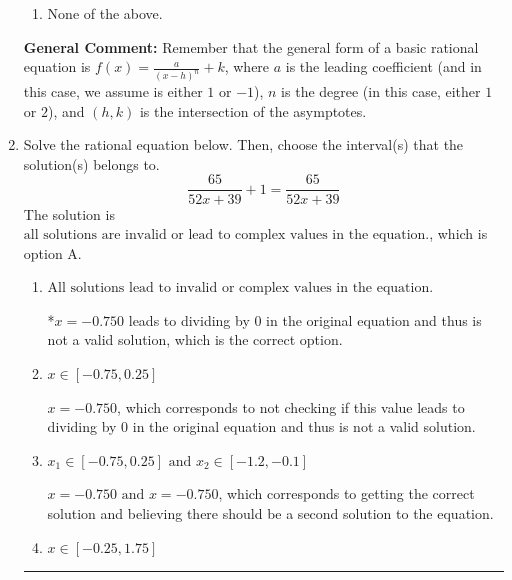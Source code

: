 \documentclass{extbook}[14pt]
\newcommand{\litem}[1]{\item #1

\rule{\textwidth}{0.4pt}}
\begin{document}
\begin{enumerate}
{\begin{enumerate}[label=\Alph*.]
\item None of the above.\end{enumerate}
\textbf{General Comment:} Remember that the general form of a basic rational equation is $ f(x) = \frac{a}{(x-h)^n} + k$, where $a$ is the leading coefficient (and in this case, we assume is either $1$ or $-1$), $n$ is the degree (in this case, either $1$ or $2$), and $(h, k)$ is the intersection of the asymptotes.
}
\litem{
Solve the rational equation below. Then, choose the interval(s) that the solution(s) belongs to.
\[ \frac{65}{52x + 39} + 1 = \frac{65}{52x + 39} \]The solution is \( \text{all solutions are invalid or lead to complex values in the equation.} \), which is option A.\begin{enumerate}[label=\Alph*.]
\item \( \text{All solutions lead to invalid or complex values in the equation.} \)

*$x = -0.750$ leads to dividing by 0 in the original equation and thus is not a valid solution, which is the correct option.
\item \( x \in [-0.75,0.25] \)

$x = -0.750$, which corresponds to not checking if this value leads to dividing by 0 in the original equation and thus is not a valid solution.
\item \( x_1 \in [-0.75, 0.25] \text{ and } x_2 \in [-1.2,-0.1] \)

$x = -0.750 \text{ and } x = -0.750$, which corresponds to getting the correct solution and believing there should be a second solution to the equation.
\item \( x \in [-0.25,1.75] \)


\end{enumerate}}
\end{enumerate}
\end{document}
